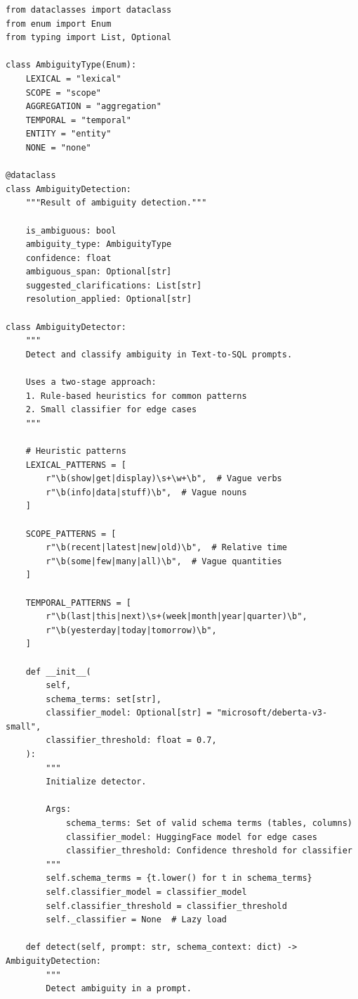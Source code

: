 \begin{lstlisting}[language=jsonx,caption={ARR module architecture}]
from dataclasses import dataclass
from enum import Enum
from typing import List, Optional

class AmbiguityType(Enum):
    LEXICAL = "lexical"
    SCOPE = "scope"
    AGGREGATION = "aggregation"
    TEMPORAL = "temporal"
    ENTITY = "entity"
    NONE = "none"

@dataclass
class AmbiguityDetection:
    """Result of ambiguity detection."""
    
    is_ambiguous: bool
    ambiguity_type: AmbiguityType
    confidence: float
    ambiguous_span: Optional[str]
    suggested_clarifications: List[str]
    resolution_applied: Optional[str]

class AmbiguityDetector:
    """
    Detect and classify ambiguity in Text-to-SQL prompts.
    
    Uses a two-stage approach:
    1. Rule-based heuristics for common patterns
    2. Small classifier for edge cases
    """
    
    # Heuristic patterns
    LEXICAL_PATTERNS = [
        r"\b(show|get|display)\s+\w+\b",  # Vague verbs
        r"\b(info|data|stuff)\b",  # Vague nouns
    ]
    
    SCOPE_PATTERNS = [
        r"\b(recent|latest|new|old)\b",  # Relative time
        r"\b(some|few|many|all)\b",  # Vague quantities
    ]
    
    TEMPORAL_PATTERNS = [
        r"\b(last|this|next)\s+(week|month|year|quarter)\b",
        r"\b(yesterday|today|tomorrow)\b",
    ]
    
    def __init__(
        self,
        schema_terms: set[str],
        classifier_model: Optional[str] = "microsoft/deberta-v3-small",
        classifier_threshold: float = 0.7,
    ):
        """
        Initialize detector.
        
        Args:
            schema_terms: Set of valid schema terms (tables, columns)
            classifier_model: HuggingFace model for edge cases
            classifier_threshold: Confidence threshold for classifier
        """
        self.schema_terms = {t.lower() for t in schema_terms}
        self.classifier_model = classifier_model
        self.classifier_threshold = classifier_threshold
        self._classifier = None  # Lazy load
    
    def detect(self, prompt: str, schema_context: dict) -> AmbiguityDetection:
        """
        Detect ambiguity in a prompt.
        

\end{lstlisting}

